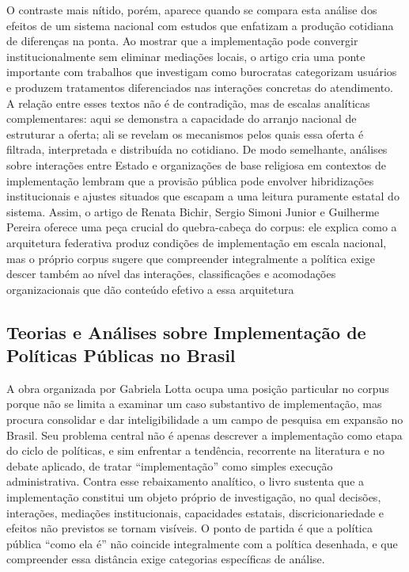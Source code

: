 \documentclass[12pt,a4paper]{article}
\begin{document}
O contraste mais nítido, porém, aparece quando se compara esta análise dos efeitos de um sistema nacional com estudos que enfatizam a produção cotidiana de diferenças na ponta. Ao mostrar que a implementação pode convergir institucionalmente sem eliminar mediações locais, o artigo cria uma ponte importante com trabalhos que investigam como burocratas categorizam usuários e produzem tratamentos diferenciados nas interações concretas do atendimento. A relação entre esses textos não é de contradição, mas de escalas analíticas complementares: aqui se demonstra a capacidade do arranjo nacional de estruturar a oferta; ali se revelam os mecanismos pelos quais essa oferta é filtrada, interpretada e distribuída no cotidiano. De modo semelhante, análises sobre interações entre Estado e organizações de base religiosa em contextos de implementação lembram que a provisão pública pode envolver hibridizações institucionais e ajustes situados que escapam a uma leitura puramente estatal do sistema. Assim, o artigo de Renata Bichir, Sergio Simoni Junior e Guilherme Pereira oferece uma peça crucial do quebra-cabeça do corpus: ele explica como a arquitetura federativa produz condições de implementação em escala nacional, mas o próprio corpus sugere que compreender integralmente a política exige descer também ao nível das interações, classificações e acomodações organizacionais que dão conteúdo efetivo a essa arquitetura\parencite{lotta2020_categorizando_usuarios,lotta2023_jesus_speaks,bichir2020_sistemas_nacionais}



\subsection{Teorias e Análises sobre Implementação de Políticas Públicas no Brasil}
\label{sec:org0c63bb0}

A obra organizada por Gabriela Lotta ocupa uma posição particular no corpus porque não se limita a examinar um caso substantivo de implementação, mas procura consolidar e dar inteligibilidade a um campo de pesquisa em expansão no Brasil. Seu problema central não é apenas descrever a implementação como etapa do ciclo de políticas, e sim enfrentar a tendência, recorrente na literatura e no debate aplicado, de tratar “implementação” como simples execução administrativa. Contra esse rebaixamento analítico, o livro sustenta que a implementação constitui um objeto próprio de investigação, no qual decisões, interações, mediações institucionais, capacidades estatais, discricionariedade e efeitos não previstos se tornam visíveis. O ponto de partida é que a política pública “como ela é” não coincide integralmente com a política desenhada, e que compreender essa distância exige categorias específicas de análise. \parencite{lotta2019_teorias_analises}
\end{document}

